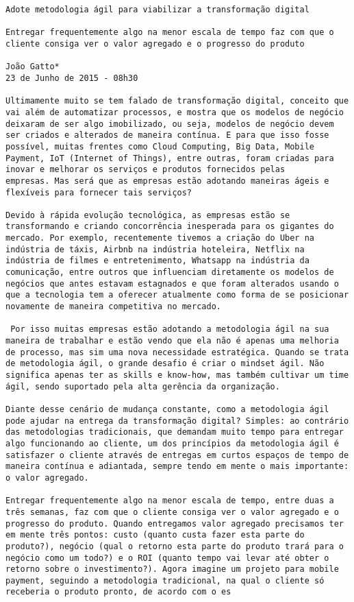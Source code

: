 \begin{verbatim}
Adote metodologia ágil para viabilizar a transformação digital

Entregar frequentemente algo na menor escala de tempo faz com que o
cliente consiga ver o valor agregado e o progresso do produto

João Gatto*
23 de Junho de 2015 - 08h30

Ultimamente muito se tem falado de transformação digital, conceito que
vai além de automatizar processos, e mostra que os modelos de negócio
deixaram de ser algo imobilizado, ou seja, modelos de negócio devem
ser criados e alterados de maneira contínua. E para que isso fosse
possível, muitas frentes como Cloud Computing, Big Data, Mobile
Payment, IoT (Internet of Things), entre outras, foram criadas para
inovar e melhorar os serviços e produtos fornecidos pelas
empresas. Mas será que as empresas estão adotando maneiras ágeis e
flexíveis para fornecer tais serviços?

Devido à rápida evolução tecnológica, as empresas estão se
transformando e criando concorrência inesperada para os gigantes do
mercado. Por exemplo, recentemente tivemos a criação do Uber na
indústria de táxis, Airbnb na indústria hoteleira, Netflix na
indústria de filmes e entretenimento, Whatsapp na indústria da
comunicação, entre outros que influenciam diretamente os modelos de
negócios que antes estavam estagnados e que foram alterados usando o
que a tecnologia tem a oferecer atualmente como forma de se posicionar
novamente de maneira competitiva no mercado.

 Por isso muitas empresas estão adotando a metodologia ágil na sua
maneira de trabalhar e estão vendo que ela não é apenas uma melhoria
de processo, mas sim uma nova necessidade estratégica. Quando se trata
de metodologia ágil, o grande desafio é criar o mindset ágil. Não
significa apenas ter as skills e know-how, mas também cultivar um time
ágil, sendo suportado pela alta gerência da organização.

Diante desse cenário de mudança constante, como a metodologia ágil
pode ajudar na entrega da transformação digital? Simples: ao contrário
das metodologias tradicionais, que demandam muito tempo para entregar
algo funcionando ao cliente, um dos princípios da metodologia ágil é
satisfazer o cliente através de entregas em curtos espaços de tempo de
maneira contínua e adiantada, sempre tendo em mente o mais importante:
o valor agregado.

Entregar frequentemente algo na menor escala de tempo, entre duas a
três semanas, faz com que o cliente consiga ver o valor agregado e o
progresso do produto. Quando entregamos valor agregado precisamos ter
em mente três pontos: custo (quanto custa fazer esta parte do
produto?), negócio (qual o retorno esta parte do produto trará para o
negócio como um todo?) e o ROI (quanto tempo vai levar até obter o
retorno sobre o investimento?). Agora imagine um projeto para mobile
payment, seguindo a metodologia tradicional, na qual o cliente só
receberia o produto pronto, de acordo com o es


\end{verbatim}
